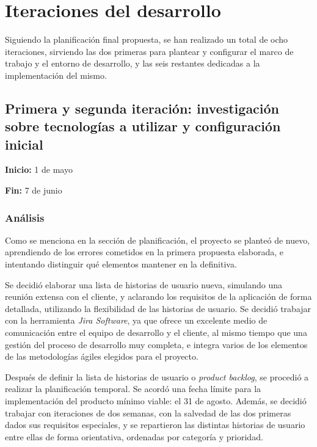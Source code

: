 \documentclass[10pt, a4paper]{aqademic}
\begin{document}
\newpage

\section{Iteraciones del desarrollo}

Siguiendo la planificación final propuesta, se han realizado un total de ocho iteraciones, sirviendo las dos primeras para plantear y configurar el marco de trabajo y el entorno de desarrollo, y las seis restantes dedicadas a la implementación del mismo.


\subsection{Primera y segunda iteración: investigación sobre tecnologías a utilizar y configuración inicial}

\textbf{Inicio:} 1 de mayo

\textbf{Fin:} 7 de junio

\subsubsection{Análisis}

Como se menciona en la sección de planificación, el proyecto se planteó de nuevo, aprendiendo de los errores cometidos en la primera propuesta elaborada, e intentando distinguir qué elementos mantener en la definitiva.

Se decidió elaborar una lista de historias de usuario nueva, simulando una reunión extensa con el cliente, y aclarando los requisitos de la aplicación de forma detallada, utilizando la flexibilidad de las historias de usuario. Se decidió trabajar con la herramienta \textit{Jira Software}, ya que ofrece un excelente medio de comunicación entre el equipo de desarrollo y el cliente, al mismo tiempo que una gestión del proceso de desarrollo muy completa, e integra varios de los elementos de las metodologías ágiles elegidos para el proyecto.

Después de definir la lista de historias de usuario o \textit{product backlog}, se procedió a realizar la planificación temporal. Se acordó una fecha límite para la implementación del producto mínimo viable: el 31 de agosto. Además, se decidió trabajar con iteraciones de dos semanas, con la salvedad de las dos primeras dados sus requisitos especiales, y se repartieron las distintas historias de usuario entre ellas de forma orientativa, ordenadas por categoría y prioridad.
\end{document}
